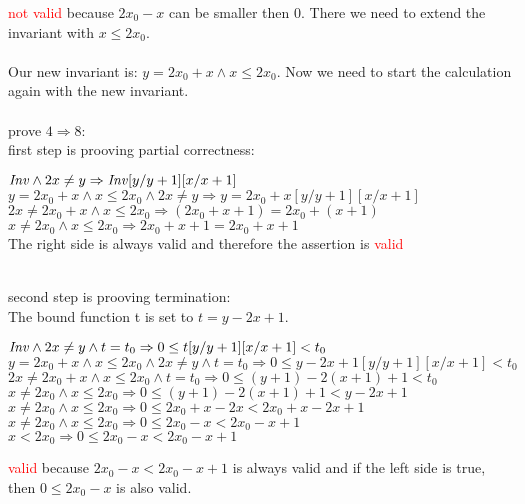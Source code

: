 \documentclass[a4paper]{scrartcl}
\begin{document}
\textcolor{red}{not valid} because $2x_0 - x$ can be smaller then 0. There we need to extend the
invariant with $x \leq 2x_0$.\\
\\
Our new invariant is: $y = 2x_0 + x \land x \leq 2x_0$. Now we need to start the calculation again with the new invariant.\\
\\
prove $4 \Rightarrow 8$:\\
first step is prooving partial correctness:\\
\begin{center}
$\mathit{Inv} \land 2x \neq y \Rightarrow \mathit{Inv} [y/y+1][x/x+1]$\\
$y = 2x_0 + x \land x \leq 2x_0 \land 2x \neq y \Rightarrow y = 2x_0 + x [y/y+1][x/x+1]$\\
$2x \neq 2x_0 + x \land x \leq 2x_0 \Rightarrow (2x_0 + x + 1) = 2x_0 + (x+1)$\\
$x \neq 2x_0 \land x \leq 2x_0 \Rightarrow 2x_0 + x + 1 = 2x_0 + x+1$\\
The right side is always valid and therefore the assertion is \textcolor{red}{valid}
\end{center} 
\\
second step is prooving termination:\\
The bound function t is set to $t = y - 2x + 1$.\\
\begin{center}
$\mathit{Inv} \land 2x \neq y \land t = t_0 \Rightarrow 0 \leq t[y/y+1][x/x+1] < t_0$\\
$y = 2x_0 + x \land x \leq 2x_0 \land 2x \neq y \land t = t_0 \Rightarrow 0 \leq y - 2x + 1[y/y+1][x/x+1] < t_0$\\
$2x \neq 2x_0 + x \land x \leq 2x_0 \land t = t_0 \Rightarrow 0 \leq (y + 1) - 2(x + 1) + 1 < t_0$\\
$x \neq 2x_0 \land x \leq 2x_0 \Rightarrow 0 \leq (y + 1) - 2(x + 1) + 1 < y - 2x + 1$\\
$x \neq 2x_0 \land x \leq 2x_0 \Rightarrow 0 \leq 2x_0 + x - 2x < 2x_0 + x - 2x + 1$\\
$x \neq 2x_0 \land x \leq 2x_0 \Rightarrow 0 \leq 2x_0 - x < 2x_0 - x + 1$\\
$x < 2x_0 \Rightarrow 0 \leq 2x_0 - x < 2x_0 - x + 1$\\
\end{center} 
\textcolor{red}{valid} because $2x_0 - x < 2x_0 - x + 1$ is always valid and if the left side is true, then $0 \leq 2x_0 - x$ is also valid.\\
\end{document}
